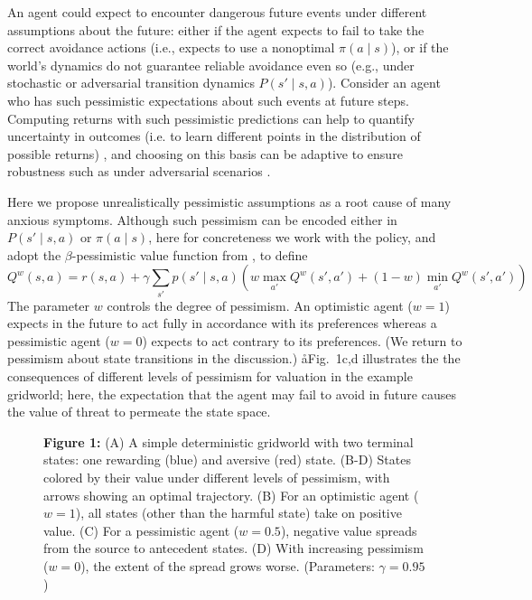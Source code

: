 \documentclass[11pt]{article} %
\begin{document}
An agent could expect to encounter dangerous future events under different assumptions about the future: either if the agent expects to fail to take the correct avoidance actions (i.e., expects to use a nonoptimal $\pi(a \mid s)$), or if the world's dynamics do not guarantee reliable avoidance even so (e.g., under stochastic or adversarial transition dynamics $P(s' \mid s,a)$). Consider an agent who has such pessimistic expectations about such events at future steps. Computing returns with such pessimistic predictions can help to quantify uncertainty in outcomes (i.e. to learn different points in the distribution of possible returns) \cite{deepmindstuff}, and choosing on this basis can be adaptive to ensure robustness such as under adversarial scenarios \cite{Garcia2015}. 

Here we propose unrealistically pessimistic assumptions as a root cause of many anxious symptoms. Although such pessimism can be encoded either in $P(s' \mid s,a)$ or $\pi(a \mid s)$, here for concreteness we work with the policy, and adopt the $\beta$-pessimistic value function from \cite{Gaskett2003}, to define
\begin{equation*}
Q^w(s,a) = r(s,a) + \gamma \sum_{s'} p(s' \mid s,a) \left( w \max_{a'} Q^w(s',a') + (1 - w) \min_{a'} Q^w(s',a') \right)
\end{equation*}
The parameter $w$ controls the degree of pessimism. An optimistic agent ($w = 1$) expects in the future to act fully in accordance with its preferences whereas a pessimistic agent ($w = 0$) expects to act contrary to its preferences. (We return to pessimism about state transitions in the discussion.) åFig.~1c,d illustrates the the consequences of different levels of pessimism for valuation in the example gridworld; here, the expectation that the agent may fail to avoid in future causes the value of threat to permeate the state space.

\begin{figure}
  \centerline{%
  }
  \par \textbf{Figure 1:} (A) A simple deterministic gridworld with two terminal states: one rewarding (blue) and aversive (red) state. (B-D) States colored by their value under different levels of pessimism, with arrows showing an optimal trajectory. (B) For an optimistic agent ($w=1$), all states (other than the harmful state) take on positive value. (C) For a pessimistic agent ($w=0.5$), negative value spreads from the source to antecedent states. (D) With increasing pessimism ($w=0$), the extent of the spread grows worse. (Parameters: $\gamma = 0.95$)
\end{figure}
\end{document}

